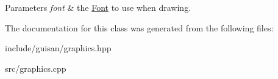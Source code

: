 \begin{DoxyParams}{Parameters}
{\em font} & the \hyperlink{classgcn_1_1Font}{Font} to use when drawing. \\
\hline
\end{DoxyParams}


The documentation for this class was generated from the following files\+:\begin{DoxyCompactItemize}
\item 
include/guisan/graphics.\+hpp\item 
src/graphics.\+cpp\end{DoxyCompactItemize}
